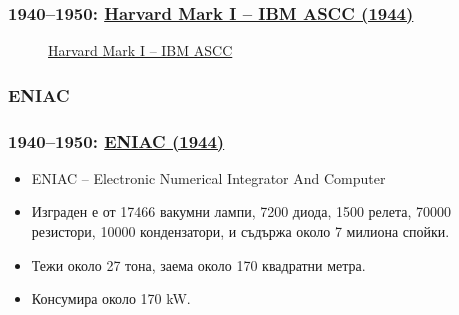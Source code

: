 \documentclass[ignorenonframetext, hyperref=unicode]{beamer}
\begin{document}
\begin{frame}
\frametitle{1940--1950: 
\href{http://en.wikipedia.org/wiki/Harvard_Mark_I}{Harvard Mark I – IBM ASCC (1944)}}
\begin{figure}[h]
\center
{}
\caption{\href{http://en.wikipedia.org/wiki/Image:Harvard_Mark_I_Computer_-_Right_Segment.JPG}{Harvard Mark I
-- IBM ASCC}}
\end{figure}
\end{frame}


\subsubsection{ENIAC}

\begin{frame}
\frametitle{1940--1950: 
\href{http://en.wikipedia.org/wiki/ENIAC}{ENIAC (1944)}}
\begin{itemize}
  \item ENIAC -- Electronic Numerical Integrator And Computer
  \item Изграден е от 17466 вакумни лампи, 7200 диода, 1500 релета, 70000
  резистори, 10000 кондензатори, и съдържа около 7 милиона спойки.
  \item Тежи около 27 тона, заема около 170 квадратни метра.
  \item Консумира около 170 kW.
\end{itemize}
\end{frame}
\end{document}
